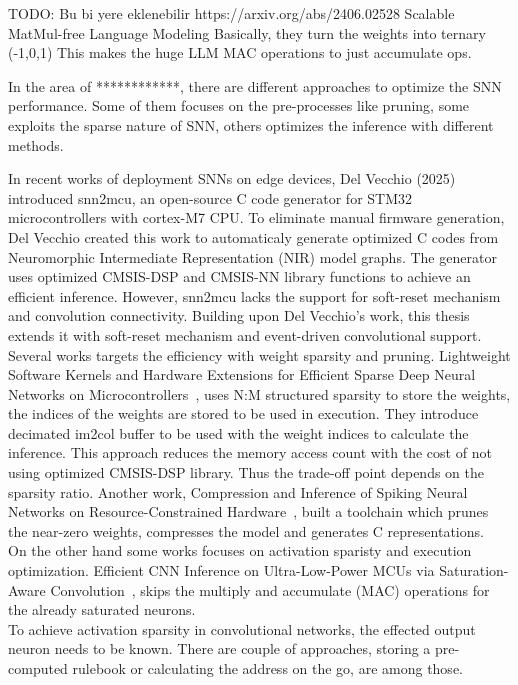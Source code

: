 \documentclass[11pt,a4paper]{article}
\begin{document}
TODO: Bu bi yere eklenebilir
https://arxiv.org/abs/2406.02528 
Scalable MatMul-free Language Modeling 
Basically, they turn the weights into ternary (-1,0,1)  
This makes the huge LLM MAC operations to just accumulate ops.  

In the area of ************, there are different approaches to optimize the SNN performance. 
Some of them focuses on the pre-processes like pruning, some exploits the sparse nature of SNN, 
others optimizes the inference with different methods. 

In recent works of deployment SNNs on edge devices,
Del Vecchio (2025) introduced snn2mcu, an open-source C code generator for STM32 microcontrollers with cortex-M7 CPU.
To eliminate manual firmware generation, 
Del Vecchio created this work to automaticaly generate optimized C codes from Neuromorphic Intermediate Representation (NIR) model graphs. 
The generator uses optimized CMSIS-DSP and CMSIS-NN library functions to achieve an efficient inference.
However, snn2mcu lacks the support for soft-reset mechanism and convolution connectivity. 
Building upon Del Vecchio's work, this thesis extends it with soft-reset mechanism and event-driven convolutional support.
\\

Several works targets the efficiency with weight sparsity and pruning. 
Lightweight Software Kernels and Hardware Extensions for Efficient Sparse Deep Neural Networks on Microcontrollers~\cite{daghero2025lightweight},
uses N:M structured sparsity to store the weights, the indices of the weights are stored to be used in execution.
They introduce decimated im2col buffer to be used with the weight indices to calculate the inference.
This approach reduces the memory access count with the cost of not using optimized CMSIS-DSP library. 
Thus the trade-off point depends on the sparsity ratio.
Another work, Compression and Inference of Spiking Neural Networks on Resource-Constrained Hardware~\cite{jurzec2025compression},
built a toolchain which prunes the near-zero weights, compresses the model and generates C representations. 
\\


On the other hand some works focuses on activation sparisty and execution optimization.
Efficient CNN Inference on Ultra-Low-Power MCUs via Saturation-Aware Convolution~\cite{li2026efficient},
skips the multiply and accumulate (MAC) operations for the already saturated neurons. 
\\


To achieve activation sparsity in convolutional networks, the effected output neuron needs to be known. 
There are couple of approaches, storing a pre-computed rulebook or calculating the address on the go, are among those.
\end{document}
